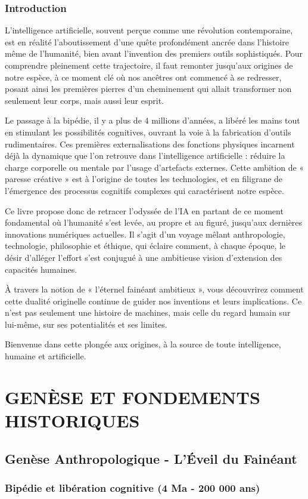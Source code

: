 \documentclass[12pt,a4paper]{book}
\begin{document}
\newpage 
\pagestyle{empty}
\tableofcontents

\newpage
\pagestyle{plain}
\section{Introduction}

L'intelligence artificielle, souvent perçue comme une révolution contemporaine, est en réalité l'aboutissement d'une quête profondément ancrée dans l'histoire même de l'humanité, bien avant l'invention des premiers outils sophistiqués. Pour comprendre pleinement cette trajectoire, il faut remonter jusqu'aux origines de notre espèce, à ce moment clé où nos ancêtres ont commencé à se redresser, posant ainsi les premières pierres d'un cheminement qui allait transformer non seulement leur corps, mais aussi leur esprit.

Le passage à la bipédie, il y a plus de 4 millions d'années, a libéré les mains tout en stimulant les possibilités cognitives, ouvrant la voie à la fabrication d'outils rudimentaires. Ces premières externalisations des fonctions physiques incarnent déjà la dynamique que l'on retrouve dans l'intelligence artificielle : réduire la charge corporelle ou mentale par l'usage d'artefacts externes. Cette ambition de « paresse créative » est à l'origine de toutes les technologies, et en filigrane de l'émergence des processus cognitifs complexes qui caractérisent notre espèce.

Ce livre propose donc de retracer l'odyssée de l'IA en partant de ce moment fondamental où l'humanité s'est levée, au propre et au figuré, jusqu'aux dernières innovations numériques actuelles. Il s'agit d'un voyage mêlant anthropologie, technologie, philosophie et éthique, qui éclaire comment, à chaque époque, le désir d'alléger l'effort s'est conjugué à une ambitieuse vision d'extension des capacités humaines.

À travers la notion de « l'éternel fainéant ambitieux », vous découvrirez comment cette dualité originelle continue de guider nos inventions et leurs implications. Ce n'est pas seulement une histoire de machines, mais celle du regard humain sur lui-même, sur ses potentialités et ses limites.

Bienvenue dans cette plongée aux origines, à la source de toute intelligence, humaine et artificielle.

\newpage
\part{GENÈSE ET FONDEMENTS HISTORIQUES}

\chapter{Genèse Anthropologique - L'Éveil du Fainéant}

\section{Bipédie et libération cognitive (4 Ma - 200 000 ans)}
\end{document}
